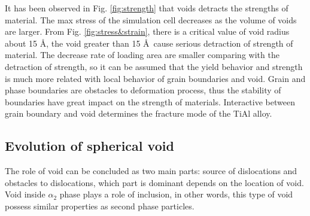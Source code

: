 \documentclass[Unknown,article,submit,moreauthors,pdftex,10pt,a4paper]{Definitions/mdpi}
\begin{document}
It has been observed in Fig. \ref{fig:strength} that voids detracts the strengths of  material. The max stress  of the simulation cell decreases as the volume of voids are larger. From Fig. \ref{fig:stress&strain}, there is a critical value of void radius about 15 \AA, the void greater than 15 \AA\ cause serious detraction of strength of material.  The decrease rate of loading area are smaller comparing with the detraction of strength, so it can be assumed that the  yield behavior and strength is much more related with local behavior of grain boundaries and void. Grain and phase boundaries are obstacles to deformation process, thus the stability of boundaries have great impact on the strength of materials. Interactive between grain boundary and void determines the fracture mode of the TiAl alloy.




\subsection{Evolution of spherical void}
The role of void can be concluded as two main parts: source of dislocations and obstacles to dislocations, which part is dominant depends on the location of void. Void inside $\alpha_2$ phase plays a role of inclusion, in other words, this type of void possess similar properties as second phase particles.
 
\end{document}

